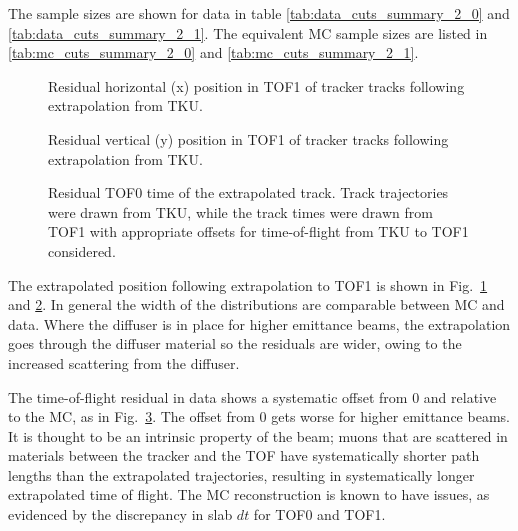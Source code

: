The sample sizes are shown for data in table \ref{tab:data_cuts_summary_2_0} and
\ref{tab:data_cuts_summary_2_1}. The equivalent MC sample sizes are listed in 
\ref{tab:mc_cuts_summary_2_0} and \ref{tab:mc_cuts_summary_2_1}.


\let\splitcell\undefined

\let\splitcell\undefined

\let\splitcell\undefined

\begin{figure}[!tbh]
    \centering
    {Residual horizontal (x) position in TOF1 of tracker tracks following extrapolation from TKU. \label{fig:tof1_extrapolated_x}}
\end{figure}

\begin{figure}[!tbh]
    \centering
    {Residual vertical (y) position in TOF1 of tracker tracks following extrapolation from TKU. \label{fig:tof1_extrapolated_y}}
\end{figure}

\begin{figure}[!tbh]
    \centering
    {Residual TOF0 time of the extrapolated track. Track trajectories were drawn from TKU, while the track times were
    drawn from TOF1 with appropriate offsets for time-of-flight from TKU to TOF1 considered. \label{fig:tof0_extrapolated_t}}
\end{figure}

The extrapolated position following extrapolation to TOF1 is shown in Fig.~\ref{fig:tof1_extrapolated_x} and \ref{fig:tof1_extrapolated_y}.
In general the width of the distributions are comparable between MC and data. Where the diffuser is in
place for higher emittance beams, the extrapolation goes through the diffuser
material so the residuals are wider, owing to the increased scattering from the
diffuser.

The time-of-flight residual in data shows a systematic offset from 0 and relative to the
MC, as in Fig.~\ref{fig:tof0_extrapolated_t}. The offset from 0 gets worse for higher emittance beams. It is thought to be
an intrinsic property of the beam; muons that are scattered in materials between 
the tracker and the TOF have systematically shorter path lengths than the 
extrapolated trajectories, resulting in systematically longer extrapolated time
of flight. The MC reconstruction is known to have issues, as evidenced by the 
discrepancy in slab $dt$ for TOF0 and TOF1.

